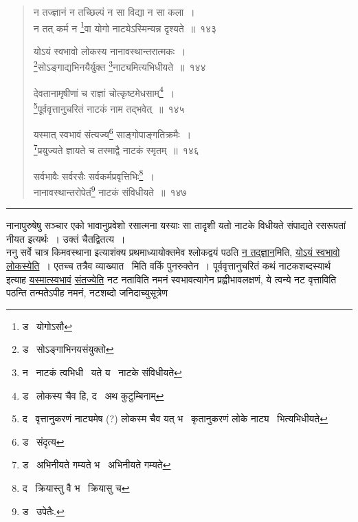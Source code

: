 \documentclass[11pt, openany]{book}
\begin{document}
\begin{quote}
{\na न तज्ज्ञानं न तच्छिल्पं न सा विद्या न सा कला~।\\
न तत् कर्म न \renewcommand{\thefootnote}{1}\footnote{ड \textendash\ योगोऽसौ}वा योगो नाट्येऽस्मिन्यन्न दृश्यते~॥~१४३

योऽयं स्वभावो लोकस्य नानावस्थान्तरात्मकः~।\\
\renewcommand{\thefootnote}{2}\footnote{ड \textendash\ सोऽङ्गाभिनयसंयुक्तो}सोऽङ्गाद्यभिनयैर्युक्त \renewcommand{\thefootnote}{3}\footnote{न \textendash\ नाटकं त्वभिधी \textendash\ यते य \textendash\ नाटके संविधीयते}नाट्यमित्यभिधीयते~॥~१४४

देवतानामृषीणां च राज्ञां चोत्कृष्टमेधसाम्\renewcommand{\thefootnote}{4}\footnote{ड \textendash\ लोकस्य चैव हि, द \textendash\ अथ कुटुम्बिनाम्}~।\\
\renewcommand{\thefootnote}{5}\footnote{द \textendash\ वृत्तानुकरणं नाट्यमेष (?) लोकस्म चैव यत् भ \textendash\ कृतानुकरणं लोके नाट्य \textendash\ भित्यभिधीयते}पूर्ववृत्तानुचरितं नाटकं नाम तद्भवेत्~॥~१४५

यस्मात् स्वभावं संत्यज्य\renewcommand{\thefootnote}{6}\footnote{ड \textendash\ संदृत्य} साङ्गोपाङ्गतिक्रमैः~।\\
\renewcommand{\thefootnote}{7}\footnote{ड \textendash\ अभिनीयते गम्यते भ \textendash\ अभिनीयते गम्यते}प्रयुज्यते ज्ञायते च तस्माद्वै नाटकं स्मृतम्~॥~१४६

सर्वभावैः सर्वरसैः सर्वकर्मप्रवृत्तिभिः\renewcommand{\thefootnote}{8}\footnote{द \textendash\ क्रियास्तु वै भ \textendash\ क्रियासु च}~।\\
नानावस्थान्तरोपेतं\renewcommand{\thefootnote}{9}\footnote{ड \textendash\ उपेतैः.} नाटकं संविधीयते~॥~१४७}
\end{quote}

\hrule

\vspace{2mm}
\noindent
नानापुरुषेषु सञ्चार एको भावानुप्रवेशो रसात्मना यस्याः सा तादृशी यतो नाटके विधीयते संपाद्यते रसरूपतां नीयत इत्यर्थः~। उक्तं चैतद्वितत्य~।\\

ननु सर्वे चात्र किमवस्थाना इत्याशंक्य प्रथमाध्यायोक्तमेव श्लोकद्वयं पठति \underline{न तद्ज्ञान}मिति, \underline{योऽयं स्वभावो लोकस्येति}~। एतच्च तत्रैव व्याख्यात \textendash\ मिति वकिं पुनरुक्तेन~। पूर्ववृत्तानुचरितं कथं नाटकशब्दस्यार्थ इत्याह \underline{यस्मात्स्वभावं} \underline{संतज्येति} नट नताविति नमनं स्वभावत्यागेन प्रह्वीभावलक्षणं, ये त्वन्ये नट वृत्ताविति पठन्ति तन्मतेऽपीह नमनं, नटशब्दो जनिदाच्युसूत्रेण
\end{document}
